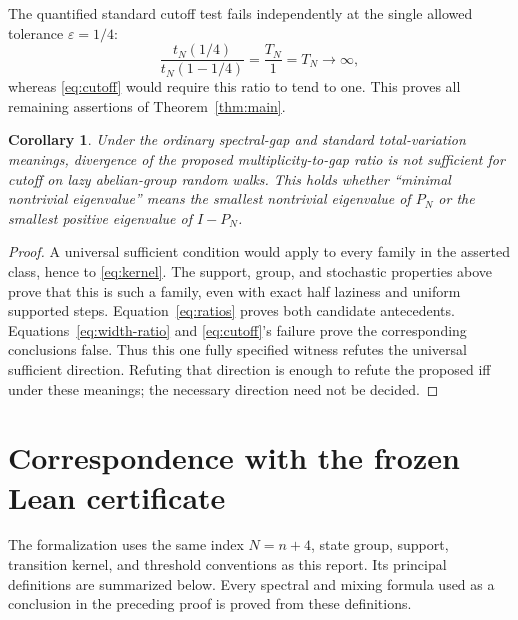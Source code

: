 \documentclass[11pt,a4paper]{article}
\newtheorem{corollary}[theorem]{Corollary}
\theoremstyle{definition}
\theoremstyle{remark}
\begin{document}
The quantified standard cutoff test fails independently at the single
allowed tolerance $\varepsilon=1/4$:
\[
\frac{t_N(1/4)}{t_N(1-1/4)}
=\frac{T_N}{1}=T_N\longrightarrow\infty,
\]
whereas \eqref{eq:cutoff} would require this ratio to tend to one. This
proves all remaining assertions of Theorem~\ref{thm:main}.

\begin{corollary}\label{cor:refutation}
Under the ordinary spectral-gap and standard total-variation meanings,
divergence of the proposed multiplicity-to-gap ratio is not sufficient for
cutoff on lazy abelian-group random walks. This holds whether ``minimal
nontrivial eigenvalue'' means the smallest nontrivial eigenvalue of $P_N$
or the smallest positive eigenvalue of $I-P_N$.
\end{corollary}
\begin{proof}
A universal sufficient condition would apply to every family in the
asserted class, hence to \eqref{eq:kernel}. The support, group, and stochastic
properties above prove that this is such a family, even with exact half
laziness and uniform supported steps. Equation~\eqref{eq:ratios} proves
both candidate antecedents. Equations~\eqref{eq:width-ratio} and
\eqref{eq:cutoff}'s failure prove the corresponding conclusions false.
Thus this one fully specified witness refutes the universal sufficient
direction. Refuting that direction is enough to refute the proposed iff
under these meanings; the necessary direction need not be decided.
\end{proof}

\section{Correspondence with the frozen Lean certificate}

The formalization uses the same index $N=n+4$, state group, support,
transition kernel, and threshold conventions as this report. Its principal
definitions are summarized below. Every spectral and mixing formula used
as a conclusion in the preceding proof is proved from these definitions.
\end{document}
